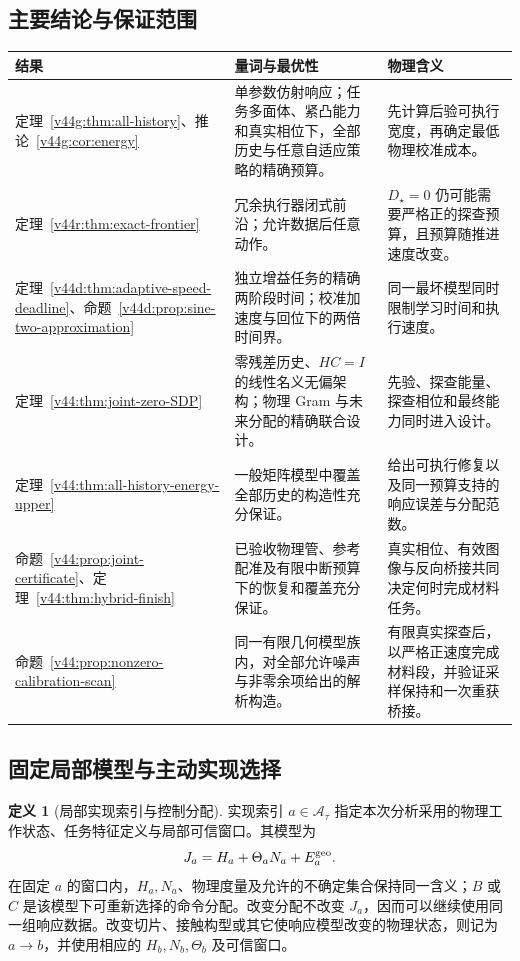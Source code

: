 \documentclass[11pt,a4paper]{article}
\numberwithin{equation}{section}
\theoremstyle{definition}
\newtheorem{definition}[theorem]{定义}
\begin{document}
\subsection{主要结论与保证范围}
\begin{center}\small
\begin{tabularx}{\linewidth}{p{.23\linewidth}YY}
\toprule
结果 & 量词与最优性 & 物理含义\\
\midrule
定理~\ref{v44g:thm:all-history}、推论~\ref{v44g:cor:energy}
& 单参数仿射响应；任务多面体、紧凸能力和真实相位下，全部历史与任意自适应策略的精确预算。
& 先计算后验可执行宽度，再确定最低物理校准成本。\\
定理~\ref{v44r:thm:exact-frontier}
& 冗余执行器闭式前沿；允许数据后任意动作。
& $D_\star=0$ 仍可能需要严格正的探查预算，且预算随推进速度改变。\\
定理~\ref{v44d:thm:adaptive-speed-deadline}、命题~\ref{v44d:prop:sine-two-approximation}
& 独立增益任务的精确两阶段时间；校准加速度与回位下的两倍时间界。
& 同一最坏模型同时限制学习时间和执行速度。\\
定理~\ref{v44:thm:joint-zero-SDP}
& 零残差历史、$HC=I$ 的线性名义无偏架构；物理 Gram 与未来分配的精确联合设计。
& 先验、探查能量、探查相位和最终能力同时进入设计。\\
定理~\ref{v44:thm:all-history-energy-upper}
& 一般矩阵模型中覆盖全部历史的构造性充分保证。
& 给出可执行修复以及同一预算支持的响应误差与分配范数。\\
命题~\ref{v44:prop:joint-certificate}、定理~\ref{v44:thm:hybrid-finish}
& 已验收物理管、参考配准及有限中断预算下的恢复和覆盖充分保证。
& 真实相位、有效图像与反向桥接共同决定何时完成材料任务。\\
命题~\ref{v44:prop:nonzero-calibration-scan}
& 同一有限几何模型族内，对全部允许噪声与非零余项给出的解析构造。
& 有限真实探查后，以严格正速度完成材料段，并验证采样保持和一次重获桥接。\\
\bottomrule
\end{tabularx}
\end{center}

\subsection{固定局部模型与主动实现选择}
\label{rev:sec:scope}

\begin{definition}[局部实现索引与控制分配]
\label{rev:def:realization-levels}
实现索引 $a\in\mathcal A_\tau$ 指定本次分析采用的物理工作状态、任务特征定义与局部可信窗口。其模型为
\begin{equation}
 J_a=H_a+\Theta_aN_a+E_a^{\rm geo}.
 \label{rev:eq:indexed-model}
\end{equation}
在固定 $a$ 的窗口内，$H_a,N_a$、物理度量及允许的不确定集合保持同一含义；$B$ 或 $C$ 是该模型下可重新选择的命令分配。改变分配不改变 $J_a$，因而可以继续使用同一组响应数据。改变切片、接触构型或其它使响应模型改变的物理状态，则记为 $a\to b$，并使用相应的 $H_b,N_b,\Theta_b$ 及可信窗口。
\end{definition}
\end{document}
